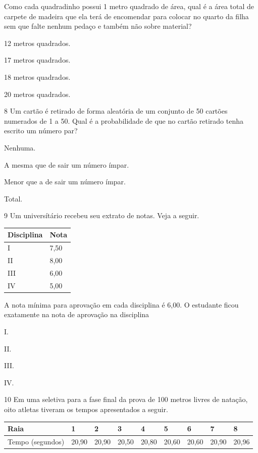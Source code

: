 \begin{mdframed}[linewidth=2pt,linecolor=salmao,roundcorner=2pt]
\begin{escolha}
{\begin{escolha}
Como cada quadradinho possui 1 metro quadrado de área, qual é a área total
de carpete de madeira que ela terá de encomendar para colocar no quarto
da filha sem que falte nenhum pedaço e também não sobre material?

\begin{escolha}
\item
  12 metros quadrados.
\item
  17 metros quadrados.
\item
  18 metros quadrados.
\item
  20 metros quadrados.
\end{escolha}


\num{8} Um cartão é retirado de forma aleatória de um conjunto de 50 cartões
numerados de 1 a 50. Qual é a probabilidade de que no cartão retirado
tenha escrito um número par?

\begin{escolha}
\item
  Nenhuma.
\item
  A mesma que de sair um número ímpar.
\item
  Menor que a de sair um número ímpar.
\item
  Total.
\end{escolha}


\num{9} Um universítário recebeu seu extrato de notas. Veja a seguir.

\begin{longtable}[]{@{}ll@{}}
\toprule
Disciplina & Nota\tabularnewline
\midrule
\endhead
I & 7,50\tabularnewline
II & 8,00\tabularnewline
III & 6,00\tabularnewline
IV & 5,00\tabularnewline
\bottomrule
\end{longtable}

A nota mínima para aprovação em cada disciplina é 6,00. O estudante ficou exatamente na nota de aprovação na disciplina

\begin{escolha}
\item
  I.
\item
  II.
\item
  III.
\item
  IV.
\end{escolha}


\num{10} Em uma seletiva para a fase final da prova de 100 metros livres de
natação, oito atletas tiveram os tempos apresentados a seguir.

\begin{longtable}[]{@{}ll@{}}
\toprule
Raia & 1 & 2 & 3 & 4 & 5 & 6 & 7 & 8\tabularnewline
\midrule
\endhead
Tempo (segundos) & 20,90 & 20,90 & 20,50 & 20,80 & 20,60 & 20,60 & 20,90 & 20,96\tabularnewline
\bottomrule
\end{longtable}


\end{escolha}}
\end{escolha}
\end{mdframed}
